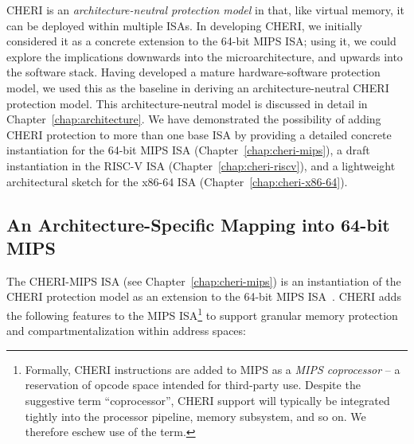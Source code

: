 CHERI is an \textit{architecture-neutral protection model} in that, like
virtual memory, it can be deployed within multiple ISAs.
In developing CHERI, we initially considered it as a concrete extension to the
64-bit MIPS ISA; using it, we could explore the implications downwards into
the microarchitecture, and upwards into the software stack.
Having developed a mature hardware-software protection model, we used this as
the baseline in deriving an architecture-neutral CHERI protection model.
This architecture-neutral model is discussed in detail in
Chapter~\ref{chap:architecture}.
We have demonstrated the possibility of adding CHERI protection to more than
one base ISA by providing a detailed concrete
instantiation for the 64-bit MIPS ISA (Chapter~\ref{chap:cheri-mips}), a
draft instantiation in the RISC-V ISA (Chapter~\ref{chap:cheri-riscv}), and a
lightweight
architectural sketch for the x86-64 ISA (Chapter~\ref{chap:cheri-x86-64}).

\subsection{An Architecture-Specific Mapping into 64-bit MIPS}
\label{sec:cheri-isa-design}


The CHERI-MIPS ISA (see Chapter~\ref{chap:cheri-mips}) is an instantiation of
the CHERI protection model as an
extension to the 64-bit MIPS ISA~\cite{Heinrich:1993:MRU:154056}.
CHERI adds the following features to the MIPS ISA\footnote{Formally,
CHERI instructions are added to MIPS as a \textit{MIPS coprocessor} -- a reservation
of opcode space intended for third-party use.
Despite the suggestive term ``coprocessor'', CHERI support will typically be
integrated tightly into the processor pipeline, memory subsystem, and so on.
We therefore eschew use of the term.} to support granular memory protection
and compartmentalization within address spaces:


